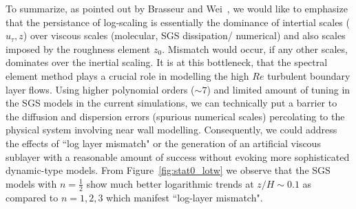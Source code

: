 To summarize, as pointed out by Brasseur and Wei~\cite{brass}, we would like to emphasize that the persistance of log-scaling is essentially the dominance of intertial scales ($u_{\tau}, z$) over viscous scales (molecular, SGS dissipation/ numerical) and also scales imposed by the roughness element $z_0$. Mismatch would occur, if any other scales, dominates over the inertial scaling. It is at this bottleneck, that the spectral element method plays a crucial role in modelling the high $Re$ turbulent boundary layer flows. Using higher polynomial orders ($\sim 7$) and limited amount of tuning in the SGS models in the current simulations, we can technically put a barrier to the diffusion and dispersion errors (spurious numerical scales) percolating to the physical system involving near wall modelling. Consequently, we could address the effects of ``log layer mismatch" or the generation of an artificial viscous sublayer with a reasonable amount of success {without evoking more sophisticated dynamic-type models}.  {From Figure~\ref{fig:stat0_lotw} we observe that the SGS models with $n = \frac{1}{2}$ show much better logarithmic trends {at $z/H \sim 0.1$} as compared to $n = 1,2,3$ which manifest ``log-layer mismatch".}

